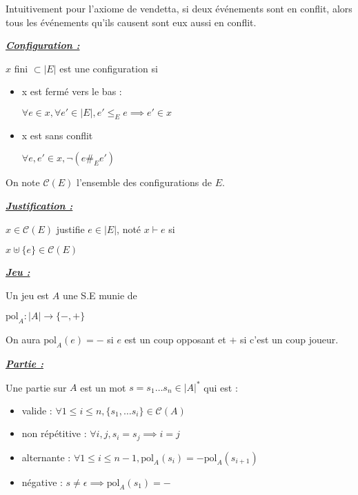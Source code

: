 \documentclass[a4paper,12ptCOUCOU
]{article}
\newlength{\mydepth}
\newlength{\myheight}
\newenvironment{answer}[1]
{\vspace{0.5cm}\begin{minipage}{\linewidth}\textbf{\textit{\underline{#1}}}\par\begin{lrbox}{\mybox}\quad\begin{minipage}{\linewidth}\color{black}\setlength{\parskip}{10pt}}
{\end{minipage}\end{lrbox}
\settodepth{\mydepth}{\usebox{\mybox}}
\settoheight{\myheight}{\usebox{\mybox}}
\addtolength{\myheight}{\mydepth}
\noindent\makebox[0pt]{
  \color{gray}\hspace{-0pt}\rule[-\mydepth]{1pt}{\myheight}}
\usebox{\mybox}
\end{minipage}
  }
\begin{document}
Intuitivement pour l'axiome de vendetta, si deux événements sont en conflit,
alors tous les événements qu'ils causent sont eux aussi en conflit.

\begin{answer}{Configuration :}

$x$ fini $\subset |E|$ est une configuration si
\begin{itemize}
\item x est fermé vers le bas :

$\forall e \in x, \forall e' \in |E|, e' \leq_E e \implies e' \in x$

\item x est sans conflit

$\forall e, e' \in x, \neg (e \#_E e')$
\end{itemize}
\end{answer}

On note $\mathcal{C}(E)$ l'ensemble des configurations de $E$.

\begin{answer}{Justification :}
$x \in \mathcal{C}(E)$ justifie $e \in |E|$, noté $x \vdash e$ si

$x \uplus \{e\} \in \mathcal{C}(E)$
\end{answer}

\begin{answer}{Jeu :}
Un jeu est $A$ une S.E munie de

$\text{pol}_A : |A| \rightarrow \{-, +\}$
\end{answer}

On aura $\text{pol}_A(e) = -$ si $e$ est un coup opposant et $+$ si
c'est un coup joueur.

\begin{answer}{Partie :}
Une partie sur $A$ est un mot $s = s_1 \dots s_n \in |A|^*$ qui est :
\begin{itemize}
\item valide :
$\forall 1\leq i \leq n, \{s_1, \dots s_i\} \in \mathcal{C}(A)$

\item non répétitive :
$\forall i, j, s_i = s_j \implies i = j$

\item alternante :
$\forall 1 \leq i \leq n-1, \text{pol}_A(s_i) = - \text{pol}_A(s_{i+1})$

\item négative :
$s \neq \epsilon \implies \text{pol}_A(s_1) = -$
\end{itemize}
\end{answer}
\end{document}
